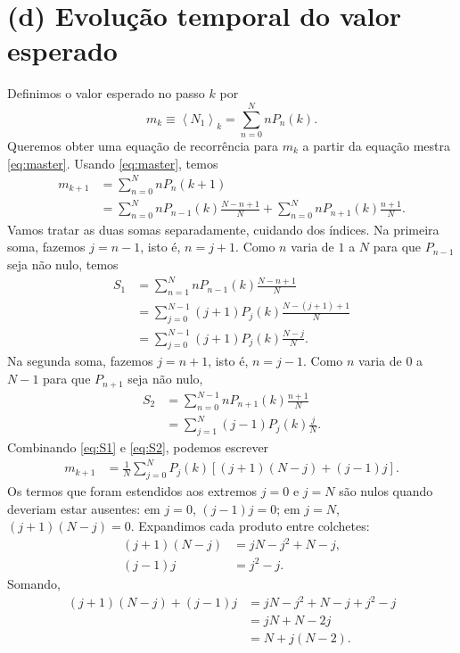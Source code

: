 \documentclass[12pt,a4paper]{article}
\newcommand{\avg}[1]{\left\langle #1\right\rangle}
\begin{document}
\section*{(d) Evolução temporal do valor esperado}
%
Definimos o valor esperado no passo $k$ por
%
\begin{equation}
  m_k\equiv\avg{N_1}_k=\sum_{n=0}^{N}nP_n(k).
  \label{eq:mk}
\end{equation}
Queremos obter uma equação de recorrência para $m_k$ a partir da equação mestra \eqref{eq:master}. Usando \eqref{eq:master}, temos
%
\begin{align}
  m_{k+1}
  &=\sum_{n=0}^{N}nP_n(k+1)\nonumber\\
  &=\sum_{n=0}^{N}nP_{n-1}(k)\frac{N-n+1}{N}
   +\sum_{n=0}^{N}nP_{n+1}(k)\frac{n+1}{N}.
  \label{eq:meanstart}
\end{align}
%
Vamos tratar as duas somas separadamente, cuidando dos índices. Na primeira soma, fazemos $j=n-1$, isto é, $n=j+1$. Como $n$ varia de $1$ a $N$ para que $P_{n-1}$ seja não nulo, temos
%
\begin{align}
  S_1
  &=\sum_{n=1}^{N}nP_{n-1}(k)\frac{N-n+1}{N}\nonumber\\
  &=\sum_{j=0}^{N-1}(j+1)P_j(k)\frac{N-(j+1)+1}{N}\nonumber\\
  &=\sum_{j=0}^{N-1}(j+1)P_j(k)\frac{N-j}{N}.
  \label{eq:S1}
\end{align}
%
Na segunda soma, fazemos $j=n+1$, isto é, $n=j-1$. Como $n$ varia de $0$ a $N-1$ para que $P_{n+1}$ seja não nulo,
%
\begin{align}
  S_2
  &=\sum_{n=0}^{N-1}nP_{n+1}(k)\frac{n+1}{N}\nonumber\\
  &=\sum_{j=1}^{N}(j-1)P_j(k)\frac{j}{N}.
  \label{eq:S2}
\end{align}
%
Combinando \eqref{eq:S1} e \eqref{eq:S2}, podemos escrever
%
\begin{align}
  m_{k+1}
  &=\frac{1}{N}\sum_{j=0}^{N}P_j(k)
       \left[(j+1)(N-j)+(j-1)j\right].
  \label{eq:meancombined}
\end{align}
%
Os termos que foram estendidos aos extremos $j=0$ e $j=N$ são nulos quando deveriam estar ausentes: em $j=0$, $(j-1)j=0$; em $j=N$, $(j+1)(N-j)=0$. Expandimos cada produto entre colchetes:
%
\begin{align*}
  (j+1)(N-j)&=jN-j^2+N-j,\\
  (j-1)j&=j^2-j.
\end{align*}
%
Somando,
%
\begin{align}
  (j+1)(N-j)+(j-1)j
  &=jN-j^2+N-j+j^2-j\nonumber\\
  &=jN+N-2j\nonumber\\
  &=N+j(N-2).
  \label{eq:bracketidentity}
\end{align}
\end{document}
